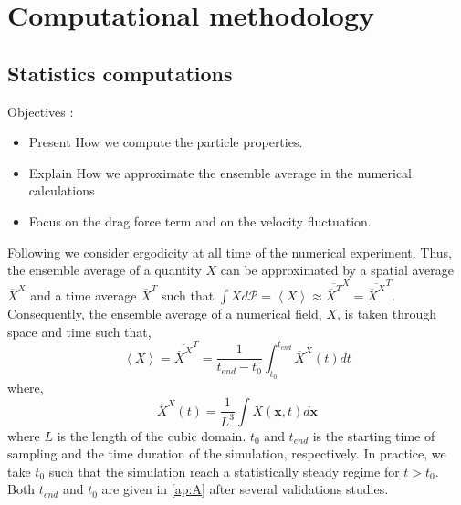 \documentclass[12pt]{My_preprint}
\newcommand{\avg}[1]{\left<#1\right>}
\renewcommand{\avg}[1]{\left<#1\right>}
\newcommand{\avgcond}[1]{\overline{#1}}
\newcommand{\Tavg}[1]{\avgcond{#1}^T}
\newcommand{\Xavg}[1]{\avgcond{#1}^X}
\newcommand{\PP}{\mathscr{P}}
\renewcommand{\ref}[1]{\autoref{#1}}
\begin{document}
% 
% 

\section{Computational methodology}






\subsection{Statistics computations}

Objectives : 
\begin{itemize}
    \item Present How we compute the particle properties. 
    \item Explain How we approximate the ensemble average in the numerical calculations
    \item Focus on the drag force term and on the velocity fluctuation. 
\end{itemize}

Following \citet{du2022analysis} we consider ergodicity at all time of the numerical experiment.
Thus, the ensemble average of a quantity $X$ can be approximated by a spatial average $\Xavg{X}$ and a time average $\Tavg{X}$ such that $\int X d\PP = \avg{X} \approx \Xavg{\Tavg{X}} = \Tavg{\Xavg{X}}$.
Consequently, the ensemble average of a numerical field, $X$, is taken through space and time such that,
\begin{equation}
    \avg{X}
    = \Tavg{\Xavg{X}}
    = \frac{1}{ t_{end} - t_0}\int_{t_0}^{t_{end}} 
    \Xavg{X}(t) dt
\end{equation}
where, 
\begin{equation}
    \Xavg{X}(t)
    = \frac{1}{L^3}\int 
    X(\textbf{x},t) d\textbf{x}
\end{equation}
where $L$ is the length of the cubic domain.
$t_0$ and $t_{end}$ is the starting time of sampling and the time duration of the simulation, respectively.
In practice, we take $t_0$ such that the simulation reach a statistically steady regime for $t>t_0$.  
Both $t_{end} $ and $t_0$ are given in \ref{ap:A} after several validations studies. 
\end{document}
